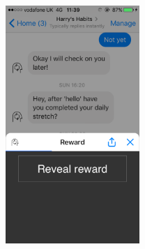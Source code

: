 \begin{figure}[H]
  \centering
  \includegraphics[width=2in]{resources/design/reward-visual-1.png}
\end{figure}
